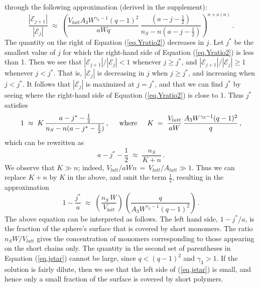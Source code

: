 \documentclass[journal=mamobx,manuscript=article]{achemso}
\begin{document}
through the following approximation (derived in the supplement):
\begin{equation}
    \label{eq.Yratio2}
       \frac{|\mathcal{E}_{j+1}|}{|\mathcal{E}_j|} \; \approx \; 
       \left(  \frac{ V_{latt}A_3W^{\gamma_3-1}(q-1)^2}{aWq} \,
          \frac{(a-j-\frac{1}{2})}{n_S-n(a-j-\frac{1}{2})} \right)^{n+o(n)}   \,.
\end{equation}
The quantity on the right of Equation (\ref{eq.Yratio2}) decreases in $j$.  Let $j^*$ be the 
smallest value of $j$ for which the right-hand side of Equation (\ref{eq.Yratio2}) is less than 1.
Then we see that $|\mathcal{E}_{j+1}|/|\mathcal{E}_j|<1$ whenever $j\geq j^*$, and 
$|\mathcal{E}_{j+1}|/|\mathcal{E}_j|\geq 1$ whenever $j< j^*$.
That is, $|\mathcal{E}_j|$ is decreasing in $j$ when $j\geq j^*$, and 
increasing when $j< j^*$.
It follows that $|\mathcal{E}_j|$ is maximized at $j=j^*$, and that we can find $j^*$ by seeing 
where the right-hand side of Equation (\ref{eq.Yratio2}) is close to 1.   Thus $j^*$ satisfies
\[     1  \;\approx \; 
     K  \,
          \frac{a-j^*-\frac{1}{2}}{n_S-n(a-j^*-\frac{1}{2})}    \,,  
             \hspace{5mm}\hbox{where}\hspace{5mm}
             K \;=\;   \frac{ V_{latt} }{aW}\, \frac{   A_3W^{\gamma_3-1}(q-1)^2}{q} \,,
\]
which can be rewritten as 
\[       a-j^*-\frac{1}{2} \; \approx\;    \frac{n_S}{K+n}   \,.
\]
We observe that $K\gg n$; indeed,  $V_{latt}/aWn \,=\,V_{latt}/A_{latt}\gg 1$.  
Thus we can replace $K+n$ by $K$ in the above, and omit the term $\frac{1}{2}$, resulting in the   
approximation 
\begin{equation}
    \label{eq.jstar}
     1-\frac{j^*}{a}     \; \approx   \; 
        \left(  \frac{n_S\,W}{V_{latt} }\right) \,\left(   \frac{q}{A_3W^{\gamma_3-1}(q-1)^2}\right)  \,.
\end{equation}
The above equation can be interpreted as follows.  The left hand side, $1-j^*/a$, is the fraction of the
sphere's surface that is covered by short monomers.  The ratio $n_SW/V_{latt}$ gives
the concentration of monomers corresponding to those appearing on the short chains only.
The quantity in the second set of 
parentheses in Equation (\ref{eq.jstar}) cannot be large, since $q<(q-1)^2$ and $\gamma_3>1$.
If the solution is fairly dilute, then we see that the left side of (\ref{eq.jstar}) is small,
and hence only a small fraction of the surface is covered by short polymers.
\end{document}
